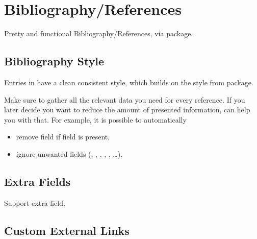 \section{Bibliography/References}%
\label{sec:Bibliography/References}

Pretty and functional Bibliography/References, via  package.

\subsection{Bibliography Style}%
\label{sub:Bibliography Style}

Entries in  have a clean consistent style, which builds on the  style from  package.

\begin{tip}
    Make sure to gather all the relevant data you need for every reference.
    If you later decide you want to reduce the amount of presented information,  can help you with that.
    For example, it is possible to automatically
    \begin{itemize}
        \item remove  field if  field is present,
        \item ignore unwanted fields (, , , , , \ldots). \qedhere*
    \end{itemize}
\end{tip}

\subsection{Extra Fields}%
\label{sub:Extra Fields}

Support extra  field.

\subsection{Custom External Links}%
\label{sub:Custom External Links}


